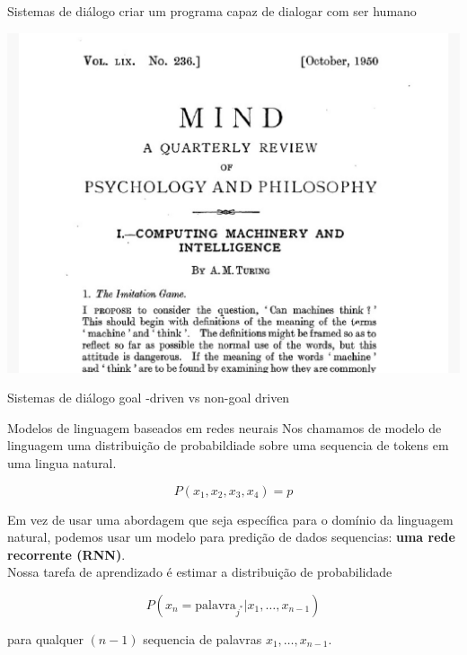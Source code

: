 \documentclass[10pt]{beamer}
\begin{document}
\nocite{DeepLearningbook}


\maketitle


\begin{frame}{Sistemas de diálogo}
 criar um programa capaz de dialogar com ser humano
\begin{center}
\includegraphics[scale=0.16]{images/turing.jpg}
\end{center}
\end{frame}


\begin{frame}{Sistemas de diálogo}
goal -driven vs non-goal driven
\end{frame}


\begin{frame}{Modelos de linguagem baseados em redes neurais}
Nos chamamos de \alert{modelo de linguagem} uma distribuição de probabildiade sobre uma sequencia de tokens em uma lingua natural.

\[
P(x_1,x_2,x_3,x_4) = p
\]

Em vez de usar uma abordagem que seja específica para o domínio da linguagem natural, podemos usar um modelo para predição de dados sequencias:  \textbf{uma rede recorrente (RNN)}. \\

Nossa tarefa de aprendizado é estimar a distribuição de probabilidade

\[
P(x_{n} = \text{palavra}_{j^{*}} | x_{1}, \dots ,x_{n-1})
\]

para qualquer $(n-1)$ sequencia de palavras $x_{1}, \dots ,x_{n-1}$.

\end{frame}
\end{document}
